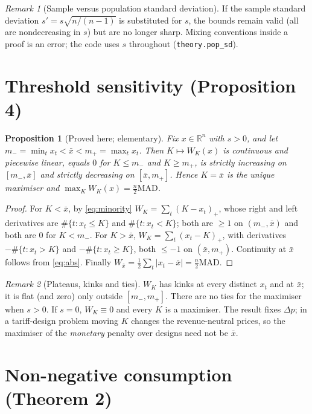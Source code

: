 \documentclass[11pt,a4paper]{article}
\newtheorem{proposition}{Proposition}
\theoremstyle{definition}
\theoremstyle{plain}\newtheorem{sprop}{Proposition}[section]\newtheorem{slemma}[sprop]{Lemma}\newtheorem{scor}[sprop]{Corollary}
\theoremstyle{definition}
\theoremstyle{remark}
\newtheorem{remark}{Remark}
\newcommand{\xbar}{\bar{x}}
\newcommand{\pos}[1]{\left(#1\right)_{+}}
\numberwithin{equation}{section}
\begin{document}
\begin{remark}[Sample versus population standard deviation]\label{rem:sample}
If the sample standard deviation $s'=s\sqrt{n/(n-1)}$ is substituted for $s$, the bounds remain valid (all are nondecreasing in $s$) but are no longer sharp. Mixing conventions inside a proof is an error; the code uses $s$ throughout (\texttt{theory.pop\_sd}).
\end{remark}

\section{Threshold sensitivity (Proposition 4)}\label{sec:S6}

\setcounter{proposition}{3}\begin{proposition}[Proved here; elementary]\label{prop:threshold}
Fix $x\in\mathbb R^n$ with $s>0$, and let $m_-=\min_tx_t<\xbar<m_+=\max_tx_t$. Then $K\mapsto W_K(x)$ is continuous and piecewise linear, equals $0$ for $K\le m_-$ and $K\ge m_+$, is strictly increasing on $[m_-,\xbar]$ and strictly decreasing on $[\xbar,m_+]$. Hence $K=\xbar$ is the unique maximiser and $\max_KW_K(x)=\frac n2\mathrm{MAD}$.
\end{proposition}
\begin{proof}
For $K<\xbar$, by \eqref{eq:minority} $W_K=\sum_t\pos{K-x_t}$, whose right and left derivatives are $\#\{t:x_t\le K\}$ and $\#\{t:x_t<K\}$; both are $\ge1$ on $(m_-,\xbar)$ and both are $0$ for $K<m_-$. For $K>\xbar$, $W_K=\sum_t\pos{x_t-K}$, with derivatives $-\#\{t:x_t>K\}$ and $-\#\{t:x_t\ge K\}$, both $\le-1$ on $(\xbar,m_+)$. Continuity at $\xbar$ follows from \eqref{eq:abs}. Finally $W_{\xbar}=\frac12\sum_t|x_t-\xbar|=\frac n2\mathrm{MAD}$.
\end{proof}

\begin{remark}[Plateaus, kinks and ties]
$W_K$ has kinks at every distinct $x_t$ and at $\xbar$; it is flat (and zero) only outside $[m_-,m_+]$. There are no ties for the maximiser when $s>0$. If $s=0$, $W_K\equiv0$ and every $K$ is a maximiser. The result fixes $\Delta p$; in a tariff-design problem moving $K$ changes the revenue-neutral prices, so the maximiser of the \emph{monetary} penalty over designs need not be $\xbar$.
\end{remark}

\section{Non-negative consumption (Theorem 2)}\label{sec:S7}
\end{document}
